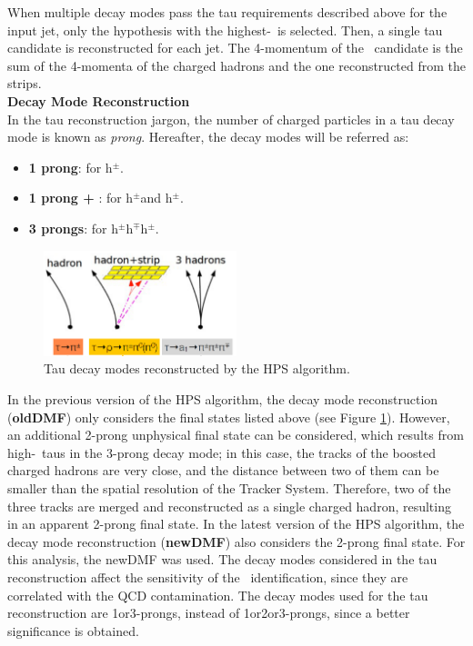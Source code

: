 \noindent When multiple decay modes pass the tau requirements described above for the input jet, 
only the hypothesis with the highest-\pt~is selected. Then, a single 
tau candidate is reconstructed for each jet. The 4-momentum of the \tauh~candidate
is the sum of the 4-momenta of the charged hadrons and the one 
reconstructed from the strips.\\

\textbf{Decay Mode Reconstruction}\\

\noindent In the tau reconstruction jargon, the number of charged particles in a 
tau decay mode is known as \textit{prong}. Hereafter, the decay modes will 
be referred as:
\begin{itemize}
 \item \textbf{1 prong}: for h$^{\pm}$.
 \item \textbf{1 prong + \picero}: for h$^{\pm}$\picero and h$^{\pm}$\picero\picero.
 \item \textbf{3 prongs}: for h$^{\pm}$h$^{\mp}$h$^{\pm}$.
\end{itemize}

\begin{figure}[ht]
  \begin{center}
    \includegraphics[width=0.5\textwidth]{figuras/Chapter3/taudecays.png}
    \caption{Tau decay modes reconstructed by the HPS algorithm.}
    \label{fig:taudecaysReco}
  \end{center}
\end{figure} 

\noindent In the previous version of the HPS algorithm, the decay mode 
reconstruction (\textbf{oldDMF}) only considers the final states listed 
above (see Figure \ref{fig:taudecaysReco}). However, an additional 2-prong unphysical 
final state can be considered, which results from high-\pt~taus in the 3-prong decay mode;
in this case, the tracks of the boosted charged hadrons are very close, 
and the  distance between two of them can be smaller than the spatial resolution 
of the Tracker System. Therefore, two of the three tracks are 
merged and reconstructed as a single charged hadron, resulting in an 
apparent 2-prong final state. In the latest version of the HPS algorithm, the decay mode 
reconstruction (\textbf{newDMF}) also considers the 2-prong final state. For this analysis,
the newDMF was used. The decay modes considered in the tau reconstruction 
affect the sensitivity of the \Zprime~identification, since they are correlated 
with the QCD contamination. The decay modes used for the 
tau reconstruction are 1or3-prongs, instead of 1or2or3-prongs, since a better 
significance is obtained. 

